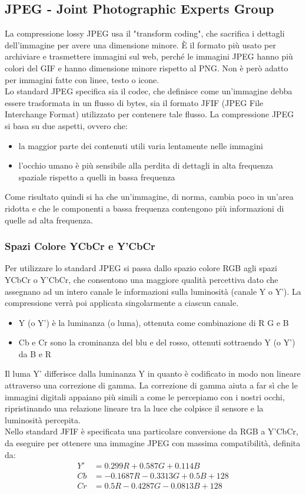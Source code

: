 \documentclass[a4paper,11pt]{article} %
\begin{document}
\subsection{JPEG - Joint Photographic Experts Group}
La compressione lossy JPEG usa il "transform coding", che sacrifica i dettagli dell'immagine per avere una dimensione minore. È il formato più usato per archiviare e trasmettere immagini sul web, perché le immagini JPEG hanno più colori del GIF e hanno dimensione minore rispetto al PNG. Non è però adatto per immagini fatte con linee, testo o icone.\\
Lo standard JPEG specifica sia il codec, che definisce come un'immagine debba essere trasformata in un flusso di bytes, sia il formato JFIF (JPEG File Interchange Format) utilizzato per contenere tale flusso.
La compressione JPEG si basa su due aspetti, ovvero che:
\begin{itemize}
\item la maggior parte dei contenuti utili varia lentamente nelle immagini
\item l'occhio umano è più sensibile alla perdita di dettagli in alta frequenza spaziale rispetto a quelli in bassa frequenza
\end{itemize}
Come risultato quindi si ha che un'immagine, di norma, cambia poco in un'area ridotta e che le componenti a bassa frequenza contengono più informazioni di quelle ad alta frequenza.

\subsubsection{Spazi Colore YCbCr e Y'CbCr}
Per utilizzare lo standard JPEG si passa dallo spazio colore RGB agli spazi YCbCr o Y'CbCr, che consentono una maggiore qualità percettiva dato che assegnano ad un intero canale le informazioni sulla luminosità (canale Y o Y'). La compressione verrà poi applicata singolarmente a ciascun canale.
\begin{itemize}
\item Y (o Y') è la luminanza (o luma), ottenuta come combinazione di R G e B
\item Cb e Cr sono la crominanza del blu e del rosso, ottenuti sottraendo Y (o Y') da B e R 
\end{itemize}

Il luma Y' differisce dalla luminanza Y in quanto è codificato in modo non lineare attraverso una correzione di gamma. La correzione di gamma aiuta a far sì che le immagini digitali appaiano più simili a come le percepiamo con i nostri occhi, ripristinando una relazione lineare tra la luce che colpisce il sensore e la luminosità percepita.\\
Nello standard JFIF è specificata una particolare conversione da RGB a Y'CbCr, da eseguire per ottenere una immagine JPEG con massima compatibilità, definita da:
\begin{align*}
Y' & = 0.299R + 0.587G + 0.114B \\
Cb & = -0.1687R - 0.3313G + 0.5B + 128 \\
Cr & = 0.5R - 0.4287G - 0.0813B + 128 \\
\end{align*}
\end{document}
